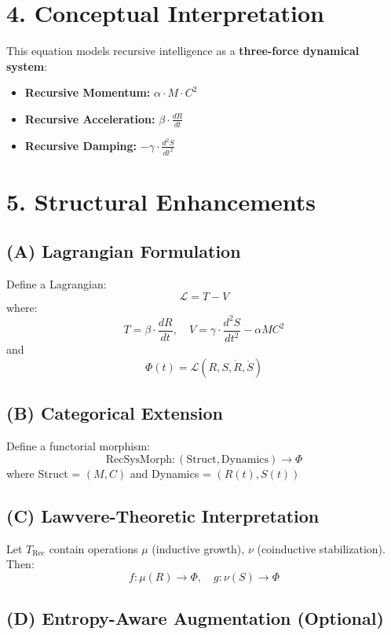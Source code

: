 \documentclass[12pt]{article}
\begin{document}
\section*{4. Conceptual Interpretation}

This equation models recursive intelligence as a \textbf{three-force dynamical system}:

\begin{itemize}
  \item \textbf{Recursive Momentum:} $\alpha \cdot M \cdot C^2$
  \item \textbf{Recursive Acceleration:} $\beta \cdot \frac{dR}{dt}$
  \item \textbf{Recursive Damping:} $-\gamma \cdot \frac{d^2S}{dt^2}$
\end{itemize}

\section*{5. Structural Enhancements}

\subsection*{(A) Lagrangian Formulation}

Define a Lagrangian:
\[
\mathcal{L} = T - V
\]
where:
\[
T = \beta \cdot \frac{dR}{dt}, \quad V = \gamma \cdot \frac{d^2S}{dt^2} - \alpha M C^2
\]
and
\[
\Phi(t) = \mathcal{L}(R, S, \dot{R}, \ddot{S})
\]

\subsection*{(B) Categorical Extension}

Define a functorial morphism:
\[
\text{RecSysMorph} : (\text{Struct}, \text{Dynamics}) \rightarrow \Phi
\]
where Struct = $(M, C)$ and Dynamics = $(R(t), S(t))$

\subsection*{(C) Lawvere-Theoretic Interpretation}

Let $T_{\text{Rec}}$ contain operations $\mu$ (inductive growth), $\nu$ (coinductive stabilization). Then:
\[
f: \mu(R) \rightarrow \Phi, \quad g: \nu(S) \rightarrow \Phi
\]

\subsection*{(D) Entropy-Aware Augmentation (Optional)}
\end{document}
